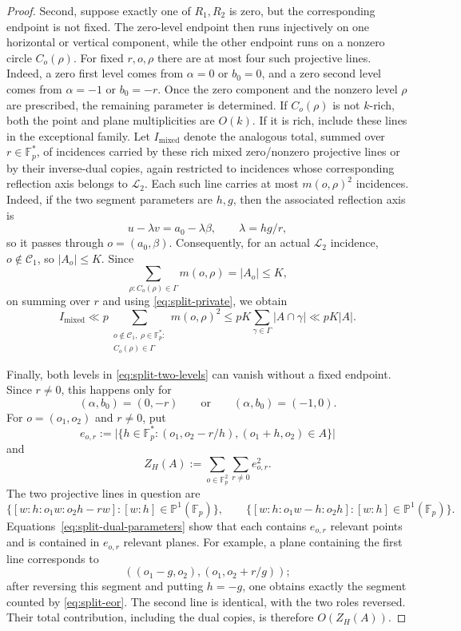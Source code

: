 \documentclass[11pt]{article}
\newcommand{\F}{\mathbb F}
\begin{document}
\begin{proof}
Second, suppose exactly one of $R_1,R_2$ is zero, but the corresponding endpoint is not fixed.  The zero-level endpoint then
runs injectively on one horizontal or vertical component, while the other endpoint runs on a nonzero circle $C_o(\rho)$.  For fixed $r,o,\rho$ there are at most four such projective lines. Indeed, a zero first level comes from $\alpha=0$ or $b_0=0$, and a zero second level comes from $\alpha=-1$ or $b_0=-r$.  Once the zero component and the nonzero level $\rho$ are prescribed, the remaining parameter is determined. 
If $C_o(\rho)$ is not $k$-rich, both the point and plane multiplicities are $O(k)$.  If it is rich, include these lines in the exceptional family. Let $I_{\mathrm{mixed}}$ denote the analogous total, summed over
$r\in\F_p^*$, of incidences carried by these rich mixed zero/nonzero
projective lines or by their inverse-dual copies, again restricted to
incidences whose corresponding reflection axis belongs to
$\mathcal L_2$.  Each such line carries at most $m(o,\rho)^2$
incidences. Indeed, if the two segment parameters are $h,g$, then the associated reflection axis is
\[
 u-\lambda v=a_0-\lambda\beta,
 \qquad \lambda=hg/r,
\]
so it passes through $o=(a_0,\beta)$. Consequently, for an actual $\mathcal L_2$ incidence,
$o\notin\mathcal C_1$, so $|A_o|\le K$.  Since
\[
 \sum_{\rho:C_o(\rho)\in\Gamma}m(o,\rho)=|A_o|\le K,
\]
on summing over $r$ and using \eqref{eq:split-private}, we obtain
\begin{equation}
 \label{eq:split-mixed}
 I_{\mathrm{mixed}}
 \ll
 p\sum_{\substack{o\notin\mathcal C_1,\ \rho\in\F_p^*:\\
                   C_o(\rho)\in\Gamma}}m(o,\rho)^2
 \le
 pK\sum_{\gamma\in\Gamma}|A\cap\gamma|
 \ll pK|A|.
\end{equation}

Finally, both levels in \eqref{eq:split-two-levels} can vanish without a fixed endpoint.  Since $r\ne0$, this happens only for
\[
 (\alpha,b_0)=(0,-r)
 \qquad\text{or}\qquad
 (\alpha,b_0)=(-1,0).
\]
For $o=(o_1,o_2)$ and $r\ne0$, put
\begin{equation}
 \label{eq:split-eor}
 e_{o,r}
 :=
 \bigl|\{h\in\F_p^*:
 (o_1,o_2-r/h),(o_1+h,o_2)\in A\}\bigr|
\end{equation}
and 
\[
Z_H(A):=\sum_{o\in\F_p^2}\sum_{r\ne0}e_{o,r}^2.
\]
The two projective lines in question are
\[
 \{[w:h:o_1w:o_2h-rw]:[w:h]\in\mathbb P^1(\F_p)\},
 \qquad
 \{[w:h:o_1w-h:o_2h]:[w:h]\in\mathbb P^1(\F_p)\}.
\]
Equations~\eqref{eq:split-dual-parameters} show that each contains $e_{o,r}$ relevant points and is contained in $e_{o,r}$ relevant planes.  For example, a plane containing the first line corresponds to
\[
 ((o_1-g,o_2),(o_1,o_2+r/g));
\]
after reversing this segment and putting $h=-g$, one obtains exactly the segment counted by \eqref{eq:split-eor}.  The second line is identical, with the two roles reversed.  Their total contribution, including the dual copies, is therefore $O(Z_H(A))$.


\end{proof}
\end{document}
